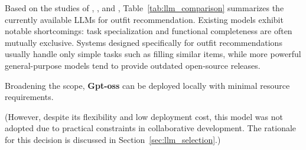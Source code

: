 Based on the studies of \cite{bi2025stepo}, \cite{wang2024text}, \cite{zhang2025collm} and \cite{openai2025gptoss}, Table~\ref{tab:llm_comparison} summarizes the currently available LLMs for outfit recommendation. Existing models exhibit notable shortcomings: task specialization and functional completeness are often mutually exclusive. Systems designed specifically for outfit recommendations usually handle only simple tasks such as filling similar items, while more powerful general-purpose models tend to provide outdated open-source releases. 

Broadening the scope, \textbf{Gpt-oss} can be deployed locally with minimal resource requirements.

(However, despite its flexibility and low deployment cost, this model was not adopted due to practical constraints in collaborative development. The rationale for this decision is discussed in Section~\ref{sec:llm_selection}.)